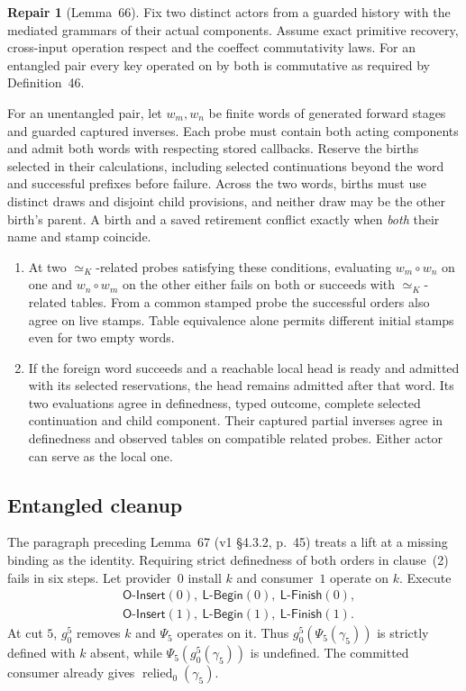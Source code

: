 \documentclass[11pt,a4paper]{article}
\theoremstyle{definition}
\newtheorem{repair}[definition]{Repair}
\theoremstyle{plain}
\newcommand{\relied}{\operatorname{relied}}
\newcommand{\OInsert}{\mathsf{O\text{-}Insert}}
\newcommand{\LBegin}{\mathsf{L\text{-}Begin}}
\newcommand{\LFinish}{\mathsf{L\text{-}Finish}}
\begin{document}
\begin{repair}[Lemma~66]
Fix two distinct actors from a guarded history with the mediated grammars of their actual components. Assume exact primitive recovery, cross-input operation respect and the coeffect commutativity laws. For an entangled pair every key operated on by both is commutative as required by Definition~46.

For an unentangled pair, let $w_m,w_n$ be finite words of generated forward stages and guarded captured inverses. Each probe must contain both acting components and admit both words with respecting stored callbacks. Reserve the births selected in their calculations, including selected continuations beyond the word and successful prefixes before failure.
Across the two words, births must use distinct draws and disjoint child provisions, and neither draw may be the other birth's parent. A birth and a saved retirement conflict exactly when \emph{both} their name and stamp coincide.
\begin{enumerate}
\item At two $\simeq_K$-related probes satisfying these conditions, evaluating $w_m\circ w_n$ on one and $w_n\circ w_m$ on the other either fails on both or succeeds with $\simeq_K$-related tables. From a common stamped probe the successful orders also agree on live stamps. Table equivalence alone permits different initial stamps even for two empty words.
\item If the foreign word succeeds and a reachable local head is ready and admitted with its selected reservations, the head remains admitted after that word. Its two evaluations agree in definedness, typed outcome, complete selected continuation and child component. Their captured partial inverses agree in definedness and observed tables on compatible related probes. Either actor can serve as the local one.
\end{enumerate}
\end{repair}

\subsection{Entangled cleanup}
\label{sec:entangled}

The paragraph preceding Lemma~67 (v1 \S4.3.2, p.~45) treats a lift at a missing binding as the identity. Requiring strict definedness of both orders in clause~(2) fails in six steps. Let provider~$0$ install $k$ and consumer~$1$ operate on $k$. Execute
\[
\begin{aligned}
 &\OInsert(0),\ \LBegin(0),\ \LFinish(0),\\
 &\OInsert(1),\ \LBegin(1),\ \LFinish(1).
\end{aligned}
\]
At cut $5$, $g_0^5$ removes $k$ and $\Psi_5$ operates on it. Thus $g_0^5(\Psi_5(\gamma_5))$ is strictly defined with $k$ absent, while $\Psi_5(g_0^5(\gamma_5))$ is undefined. The committed consumer already gives $\relied_0(\gamma_5)$.
\end{document}
